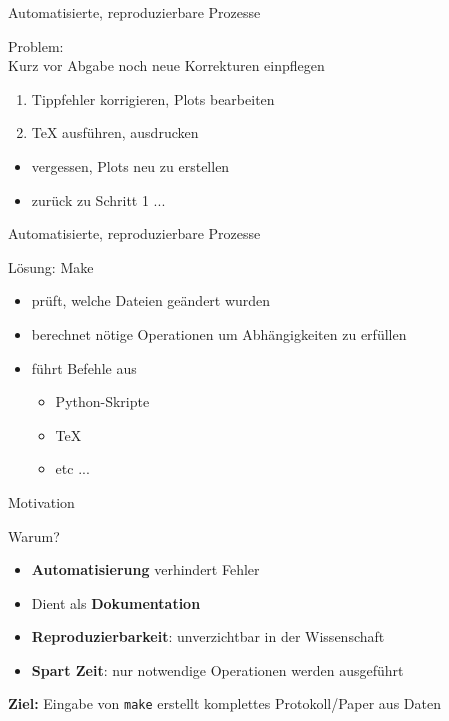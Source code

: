 \begin{frame}{Automatisierte, reproduzierbare Prozesse}

  {\huge Problem:}\\
  \vspace{1em}
  Kurz vor Abgabe noch neue Korrekturen einpflegen
  \begin{enumerate}
    \item Tippfehler korrigieren, Plots bearbeiten
    \item \TeX{} ausführen, ausdrucken
  \end{enumerate}
  \begin{itemize}
    \item vergessen, Plots neu zu erstellen
    \item zurück zu Schritt 1 ...
  \end{itemize}
\end{frame}

\begin{frame}{Automatisierte, reproduzierbare Prozesse}

  {\huge Lösung: Make}
  \vspace{1em}
  \begin{itemize}
    \item prüft, welche Dateien geändert wurden
    \item berechnet nötige Operationen um Abhängigkeiten zu erfüllen
    \item führt Befehle aus
    \begin{itemize}
      \item Python-Skripte
      \item \TeX{}
      \item etc ...
    \end{itemize}
  \end{itemize}
\end{frame}

\begin{frame}{Motivation}
  
  {\huge Warum?}
  \vspace{1em}
  \begin{itemize}
    \item \textbf{Automatisierung} verhindert Fehler
    \item Dient als \textbf{Dokumentation}
    \item \textbf{Reproduzierbarkeit}: unverzichtbar in der Wissenschaft
    \item \textbf{Spart Zeit}: nur notwendige Operationen werden ausgeführt
  \end{itemize}
  \vspace{1em}
  \textbf{Ziel:} Eingabe von \texttt{make} erstellt komplettes Protokoll/Paper aus Daten
\end{frame}
